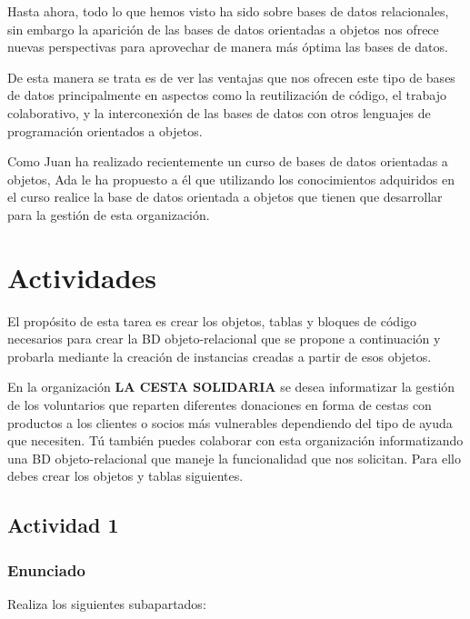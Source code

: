 Hasta ahora, todo lo que hemos visto ha sido sobre bases de datos relacionales, sin embargo la aparición de las bases de datos orientadas a objetos nos ofrece nuevas perspectivas para aprovechar de manera más óptima las bases de datos.

De esta manera se trata  es de ver las ventajas que nos ofrecen este tipo de bases de datos principalmente en aspectos como  la reutilización de código, el trabajo colaborativo, y la interconexión de las bases de datos con otros lenguajes de programación orientados a objetos.

Como Juan ha realizado recientemente un curso de bases de datos orientadas a objetos, Ada le ha propuesto a él que utilizando los conocimientos adquiridos en el curso realice la base de datos orientada a objetos que tienen que desarrollar para la gestión de esta organización.

\section{Actividades}
El propósito de esta tarea es crear los objetos, tablas y bloques de código necesarios para crear la BD objeto-relacional que se propone a continuación y probarla mediante la creación de instancias creadas a partir de esos objetos.


En la organización \textbf{LA CESTA SOLIDARIA }se  desea informatizar la gestión de los voluntarios que reparten diferentes donaciones en forma de cestas con productos a los clientes o socios más vulnerables dependiendo del tipo de ayuda que necesiten. Tú también puedes colaborar con esta organización informatizando una BD objeto-relacional que maneje la funcionalidad que nos solicitan. Para ello debes crear los objetos y tablas siguientes.

\subsection{Actividad 1}

\subsubsection{Enunciado}
Realiza los siguientes subapartados:


